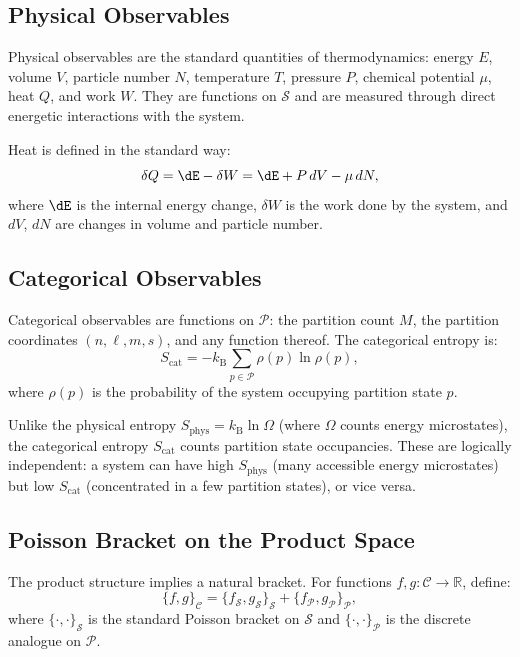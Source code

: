 \documentclass[twocolumn,10pt]{article}
\newcommand{\kB}{k_{\mathrm{B}}}
\newcommand{\Scat}{S_{\mathrm{cat}}}
\newcommand{\Sphys}{S_{\mathrm{phys}}}
\newcommand{\dQ}{\delta Q}
\newcommand{\R}{\mathbb{R}}
\begin{document}
\subsection{Physical Observables}

Physical observables are the standard quantities of thermodynamics: energy $E$, volume $V$, particle number $N$, temperature $T$, pressure $P$, chemical potential $\mu$, heat $Q$, and work $W$. They are functions on $\mathcal{S}$ and are measured through direct energetic interactions with the system.

Heat is defined in the standard way:
\begin{equation}
    \dQ = \dE - \delta W = \dE + P\,dV - \mu\,dN,
\end{equation}
where $ \dE $ is the internal energy change, $\delta W$ is the work done by the system, and $dV$, $dN$ are changes in volume and particle number.

\subsection{Categorical Observables}

Categorical observables are functions on $\mathcal{P}$: the partition count $M$, the partition coordinates $(n, \ell, m, s)$, and any function thereof. The categorical entropy is:
\begin{equation}
    \Scat = -\kB \sum_{p \in \mathcal{P}} \rho(p) \ln \rho(p),
    \label{eq:scat}
\end{equation}
where $\rho(p)$ is the probability of the system occupying partition state $p$.

Unlike the physical entropy $\Sphys = \kB \ln \Omega$ (where $\Omega$ counts energy microstates), the categorical entropy $\Scat$ counts partition state occupancies. These are logically independent: a system can have high $\Sphys$ (many accessible energy microstates) but low $\Scat$ (concentrated in a few partition states), or vice versa.

\subsection{Poisson Bracket on the Product Space}

The product structure implies a natural bracket. For functions $f, g: \mathcal{C} \to \R$, define:
\begin{equation}
    \{f, g\}_{\mathcal{C}} = \{f_\mathcal{S}, g_\mathcal{S}\}_{\mathcal{S}} + \{f_\mathcal{P}, g_\mathcal{P}\}_{\mathcal{P}},
\end{equation}
where $\{{\cdot},{\cdot}\}_\mathcal{S}$ is the standard Poisson bracket on $\mathcal{S}$ and $\{{\cdot},{\cdot}\}_\mathcal{P}$ is the discrete analogue on $\mathcal{P}$.
\end{document}
